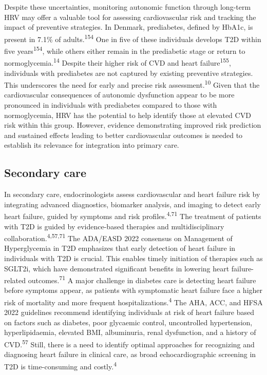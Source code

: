 \documentclass[
  a4paper,
  headsepline=true,
  open=left]{scrbook}
\begin{document}
Despite these uncertainties, monitoring autonomic function through
long-term HRV may offer a valuable tool for assessing cardiovascular
risk and tracking the impact of preventive strategies. In Denmark,
prediabetes, defined by HbA1c, is present in 7.1\% of
adults.\textsuperscript{154} One in five of these individuals develops
T2D within five years\textsuperscript{154}, while others either remain
in the prediabetic stage or return to normoglycemia.\textsuperscript{14}
Despite their higher risk of CVD and heart failure\textsuperscript{155},
individuals with prediabetes are not captured by existing preventive
strategies. This underscores the need for early and precise risk
assessment.\textsuperscript{10} Given that the cardiovascular
consequences of autonomic dysfunction appear to be more pronounced in
individuals with prediabetes compared to those with normoglycemia, HRV
has the potential to help identify those at elevated CVD risk within
this group. However, evidence demonstrating improved risk prediction and
sustained effects leading to better cardiovascular outcomes is needed to
establish its relevance for integration into primary care.

\hypertarget{secondary-care}{%
\subsection{Secondary care}\label{secondary-care}}

In secondary care, endocrinologists assess cardiovascular and heart
failure risk by integrating advanced diagnostics, biomarker analysis,
and imaging to detect early heart failure, guided by symptoms and risk
profiles.\textsuperscript{4,71} The treatment of patients with T2D is
guided by evidence-based therapies and multidisciplinary
collaboration.\textsuperscript{4,57,71} The ADA/EASD 2022 consensus on
Management of Hyperglycemia in T2D emphasizes that early detection of
heart failure in individuals with T2D is crucial. This enables timely
initiation of therapies such as SGLT2i, which have demonstrated
significant benefits in lowering heart failure-related
outcomes.\textsuperscript{71} A major challenge in diabetes care is
detecting heart failure before symptoms appear, as patients with
symptomatic heart failure face a higher risk of mortality and more
frequent hospitalizations.\textsuperscript{4} The AHA, ACC, and HFSA
2022 guidelines recommend identifying individuals at risk of heart
failure based on factors such as diabetes, poor glycaemic control,
uncontrolled hypertension, hyperlipidaemia, elevated BMI, albuminuria,
renal dysfunction, and a history of CVD.\textsuperscript{57} Still,
there is a need to identify optimal approaches for recognizing and
diagnosing heart failure in clinical care, as broad echocardiographic
screening in T2D is time-consuming and costly.\textsuperscript{4}
\end{document}
